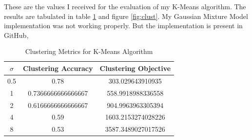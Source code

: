 \documentclass[a4paper]{article}
\newcounter{thm}
\theoremstyle{definition}
\newenvironment{soln}{
    \leavevmode\color{blue}\ignorespaces
}{}
\begin{document}
\begin{soln}
    These are the values I received for the evaluation of my K-Means algorithm. The results are tabulated in table \ref{tab:clust} and figure \ref{fig:clust}. My Gaussian Mixture Model implementation was not working properly. But the implementation is present in GitHub,

    \begin{table}[h]
        \centering
        \begin{tabular}{|c|c|c|}
            \hline
            $\sigma$ & \textbf{Clustering Accuracy} & \textbf{Clustering Objective} \\
            \hline
            0.5 & 0.78 & 303.029643910935 \\
            \hline
            1 & 0.7366666666666667 & 558.9918988336558 \\
            \hline
            2 & 0.6166666666666667 & 904.9963963305394 \\
            \hline
            4 & 0.59 & 1603.2153274028226 \\
            \hline
            8 & 0.53 & 3587.3489027017526 \\
            \hline
        \end{tabular}
        \caption{Clustering Metrics for K-Means Algorithm}
        \label{tab:clust}
    \end{table}


\end{soln}
\end{document}
